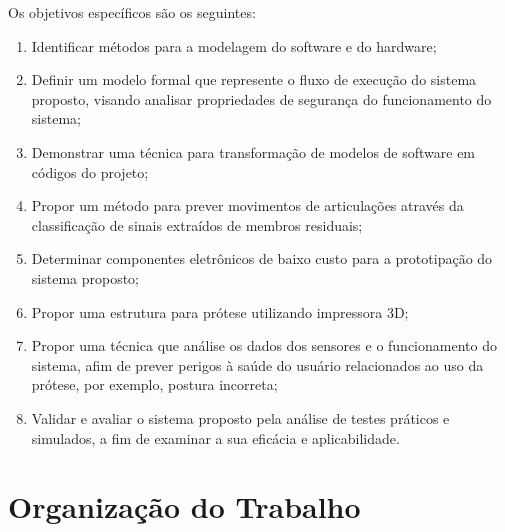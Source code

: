 
Os objetivos específicos são os seguintes:
\begin{enumerate}
  \item Identificar métodos para a modelagem do software e do hardware;
  \item Definir um modelo formal que represente o fluxo de execução do sistema proposto, visando analisar propriedades de segurança do funcionamento do sistema;
  \item Demonstrar uma técnica para transformação de modelos de software em códigos do projeto;
  \item Propor um método para prever movimentos de articulações através da classificação de sinais extraídos de membros residuais;
  \item Determinar componentes eletrônicos de baixo custo para a prototipação do sistema proposto;
  \item Propor uma estrutura para prótese utilizando impressora 3D;
  \item Propor uma técnica que análise os dados dos sensores e o funcionamento do sistema, afim de prever perigos à saúde do usuário relacionados ao uso da prótese, por exemplo, postura incorreta;
  \item Validar e avaliar o sistema proposto pela análise de testes práticos e simulados, a fim de examinar a sua eficácia e aplicabilidade.
\end{enumerate}



\section{Organização do Trabalho}
\label{sec:organizacao}

